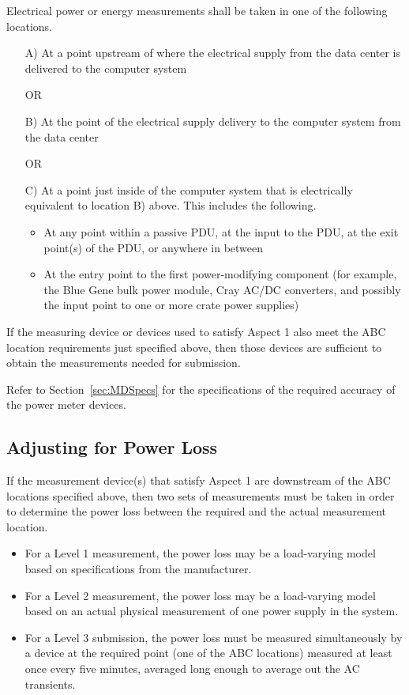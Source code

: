 \noindent
Electrical power or energy measurements shall be taken in one of the following locations.

\begin{itemize}
\item[{A)}]
At a point upstream of where the electrical supply from the data center is delivered to the computer system

OR

\item[{B)}]
At the point of the electrical supply delivery to the computer system from the data center

OR

\item[{C)}]
At a point just inside of the computer system that is electrically equivalent to location B) above.  This includes the following. 

\begin{itemize}
\item
At any point within a passive PDU, at the input to the PDU, at the exit point(s) of the PDU, or anywhere in between 
\item
At the entry point to the first power-modifying component (for example, the Blue Gene bulk power module, Cray AC/DC converters, and possibly the input point to one or more crate power supplies)
\end{itemize}
\end{itemize}

\noindent
If the measuring device or devices used to satisfy Aspect 1 also meet the ABC location requirements just specified above, then those devices are sufficient to obtain the measurements needed for submission.
\wl

\noindent
Refer to Section~\ref{sec:MDSpecs} for the specifications of the required accuracy of the power meter devices.

\subsection{Adjusting for Power Loss}
\label{sec:AfPL}
\noindent
If the measurement device(s) that satisfy Aspect 1 are downstream of the ABC locations specified above, then two sets of measurements must be taken in order to determine the power loss between the required and the actual measurement location. 

\begin{itemize}
\item
For a Level 1 measurement, the power loss may be a load-varying model based on specifications from the manufacturer.  
\item
For a Level 2 measurement, the power loss may be a load-varying model based on an actual physical measurement of one power supply in the system.  
\item
For a Level 3 submission, the power loss must be measured simultaneously by a device at the required point (one of the ABC locations) measured at least once every five minutes, averaged long enough to average out the AC transients. 
\end{itemize}

